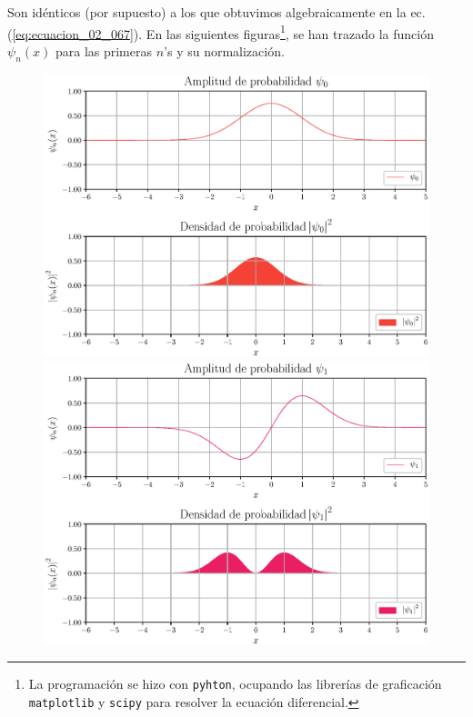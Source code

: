Son idénticos (por supuesto) a los que obtuvimos algebraicamente en la ec. (\ref{eq:ecuacion_02_067}).
\newpage
En las siguientes figuras\footnote{La programación se hizo con \texttt{pyhton}, ocupando las librerías de graficación \texttt{matplotlib} y \texttt{scipy} para resolver la ecuación diferencial.}, se han trazado la función $\psi_{n} (x)$ para las primeras $n$'s y su normalización.
\begin{figure}[H]
    \centering
    \includegraphics[scale=0.6]{Imagenes/Funcion_Onda_00.eps}
    \includegraphics[scale=0.6]{Imagenes/Funcion_Onda_01.eps}
\end{figure}
